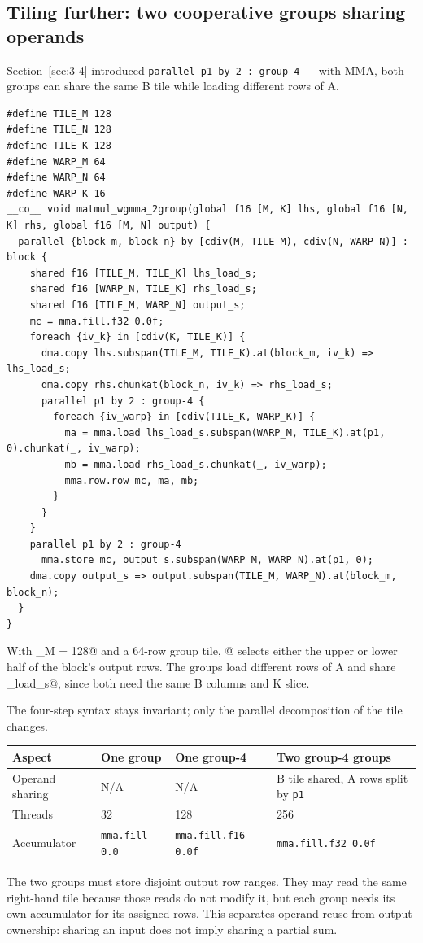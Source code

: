 \subsection*{Tiling further: two cooperative groups sharing operands}

Section~\ref{sec:3-4} introduced \texttt{parallel p1 by 2 :\allowbreak{} group-\allowbreak{}4} --- with MMA, both groups can share the same B tile while loading different rows of A.

\begin{lstlisting}[language=croqtile,caption={Tiling further: two cooperative groups sharing operands}]
#define TILE_M 128
#define TILE_N 128
#define TILE_K 128
#define WARP_M 64
#define WARP_N 64
#define WARP_K 16
__co__ void matmul_wgmma_2group(global f16 [M, K] lhs, global f16 [N, K] rhs, global f16 [M, N] output) {
  parallel {block_m, block_n} by [cdiv(M, TILE_M), cdiv(N, WARP_N)] : block {
    shared f16 [TILE_M, TILE_K] lhs_load_s;
    shared f16 [WARP_N, TILE_K] rhs_load_s;
    shared f16 [TILE_M, WARP_N] output_s;
    mc = mma.fill.f32 0.0f;
    foreach {iv_k} in [cdiv(K, TILE_K)] {
      dma.copy lhs.subspan(TILE_M, TILE_K).at(block_m, iv_k) => lhs_load_s;
      dma.copy rhs.chunkat(block_n, iv_k) => rhs_load_s;
      parallel p1 by 2 : group-4 {
        foreach {iv_warp} in [cdiv(TILE_K, WARP_K)] {
          ma = mma.load lhs_load_s.subspan(WARP_M, TILE_K).at(p1, 0).chunkat(_, iv_warp);
          mb = mma.load rhs_load_s.chunkat(_, iv_warp);
          mma.row.row mc, ma, mb;
        }
      }
    }
    parallel p1 by 2 : group-4
      mma.store mc, output_s.subspan(WARP_M, WARP_N).at(p1, 0);
    dma.copy output_s => output.subspan(TILE_M, WARP_N).at(block_m, block_n);
  }
}
\end{lstlisting}

With \co@TILE_M = 128@ and a 64-row group tile, @ selects either the upper or lower half of the block's output rows. The groups load different rows of A and share \co@rhs_load_s@, since both need the same B columns and K slice.

The four-step syntax stays invariant; only the parallel decomposition of the tile changes.

\begin{table}[htbp]
\centering\small
\begin{tabularx}{\linewidth}{@{}lXXX@{}}
\toprule
\textbf{Aspect} & One group & One group-4 & Two group-4 groups \\
\midrule
Operand sharing & N/A & N/A & B tile shared, A rows split by \texttt{p1} \\
Threads & 32 & 128 & 256 \\
Accumulator & \texttt{mma.fill 0.0} & \texttt{mma.\allowbreak{}fill.\allowbreak{}f16 0.\allowbreak{}0f} & \texttt{mma.\allowbreak{}fill.\allowbreak{}f32 0.\allowbreak{}0f} \\
\bottomrule
\end{tabularx}
\end{table}

The two groups must store disjoint output row ranges. They may read the same right-hand tile because those reads do not modify it, but each group needs its own accumulator for its assigned rows. This separates operand reuse from output ownership: sharing an input does not imply sharing a partial sum.
